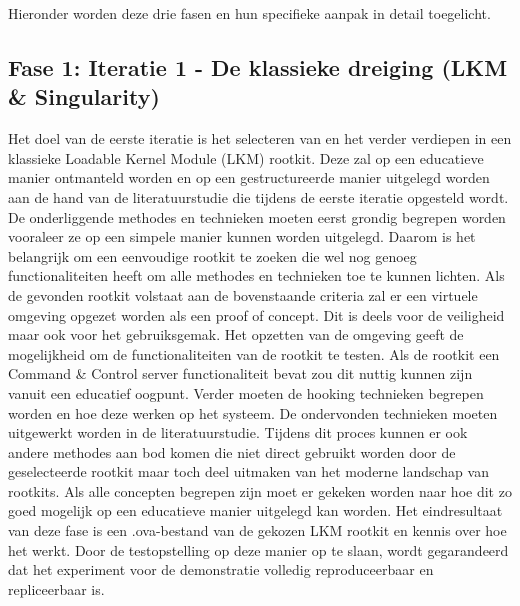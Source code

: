 Hieronder worden deze drie fasen en hun specifieke aanpak in detail toegelicht.
\subsection {Fase 1: Iteratie 1 - De klassieke dreiging (LKM & Singularity)}
Het doel van de eerste iteratie is het selecteren van en het verder verdiepen in een klassieke Loadable Kernel Module (LKM) rootkit. Deze zal op een educatieve manier ontmanteld worden en op een gestructureerde manier uitgelegd worden aan de hand van de literatuurstudie die tijdens de eerste iteratie opgesteld wordt. De onderliggende methodes en technieken moeten eerst grondig begrepen worden vooraleer ze op een simpele manier kunnen worden uitgelegd. Daarom is het belangrijk om een eenvoudige rootkit te zoeken die wel nog genoeg functionaliteiten heeft om alle methodes en technieken toe te kunnen lichten. Als de gevonden rootkit volstaat aan de bovenstaande criteria zal er een virtuele omgeving opgezet worden als een proof of concept. Dit is deels voor de veiligheid maar ook voor het gebruiksgemak. Het opzetten van de omgeving geeft de mogelijkheid om de functionaliteiten van de rootkit te testen. Als de rootkit een Command & Control server functionaliteit bevat zou dit nuttig kunnen zijn vanuit een educatief oogpunt. Verder moeten de hooking technieken begrepen worden en hoe deze werken op het systeem. De ondervonden technieken moeten uitgewerkt worden in de literatuurstudie. Tijdens dit proces kunnen er ook andere methodes aan bod komen die niet direct gebruikt worden door de geselecteerde rootkit maar toch deel uitmaken van het moderne landschap van rootkits. Als alle concepten begrepen zijn moet er gekeken worden naar hoe dit zo goed mogelijk op een educatieve manier uitgelegd kan worden. Het eindresultaat van deze fase is een .ova-bestand van de gekozen LKM rootkit en kennis over hoe het werkt. Door de testopstelling op deze manier op te slaan, wordt gegarandeerd dat het experiment voor de demonstratie volledig reproduceerbaar en repliceerbaar is.

